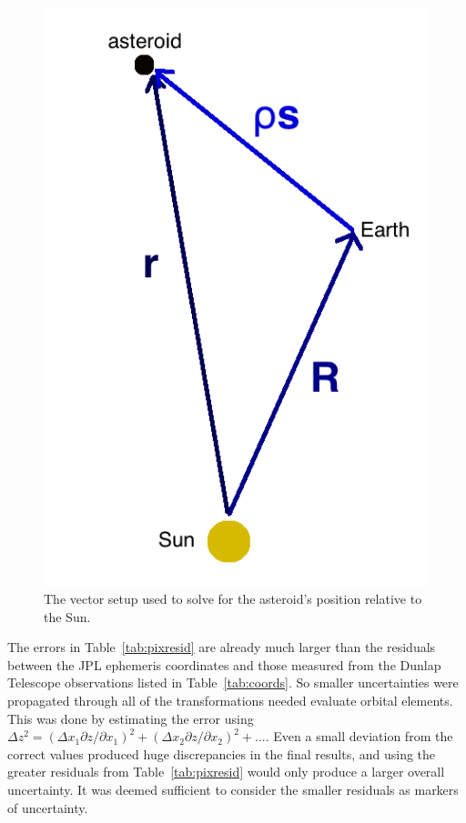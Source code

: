 \documentclass[a4paper,12pt]{article}
\begin{document}
\begin{figure}
\includegraphics[scale = 0.3]{vectors.png}
\caption{The vector setup used to solve for the asteroid's position relative to the Sun.}
\label{fig:vectors}
\end{figure}

The errors in Table~\ref{tab:pixresid} are already much larger than the residuals between the JPL ephemeris coordinates and those measured from the Dunlap Telescope observations listed in Table~\ref{tab:coords}. So smaller uncertainties were propagated through all of the transformations needed evaluate orbital elements. This was done by estimating the error using $\Delta z^2 = (\Delta x_1\partial z/\partial x_1)^2 + (\Delta x_2\partial z/\partial x_2)^2 + ...$. Even a small deviation from the correct values produced huge discrepancies in the final results, and using the greater residuals from Table~\ref{tab:pixresid} would only produce a larger overall uncertainty. It was deemed sufficient to consider the smaller residuals as markers of uncertainty.
\end{document}
